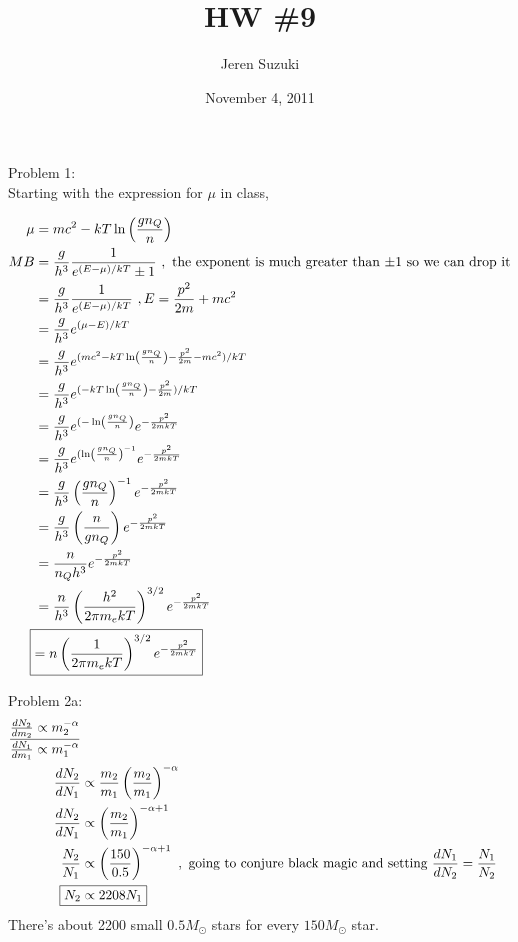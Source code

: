 \documentclass[10pt,letter,preprint]{aastex}
\newcommand{\pt}{\propto}
\newcommand{\rp}{\right)}
\newcommand{\lp}{\left(}
\newcommand{\ms}{M_\odot}
\begin{document}
\title{HW \#9}
\author{\begin{large}Jeren Suzuki\end{large}}
\author{November 4, 2011}

Problem 1:\\
Starting with the expression for $\mu$ in class, 

\begin{align}
\mu &= mc^2 - kT\ln \lp \frac{gn_Q}{n} \rp\\
MB &= \frac{g}{h^3}\frac{1}{e^{(E-\mu)/kT} \pm 1}~,\textrm{ the exponent is much greater than $\pm1$ so we can drop it}\\
&= \frac{g}{h^3}\frac{1}{e^{(E-\mu)/kT} }~,E = \frac{p^2}{2m} + mc^2\\
&= \frac{g}{h^3}e^{(\mu-E)/kT}\\
&= \frac{g}{h^3}e^{(mc^2 - kT\ln \lp \frac{gn_Q}{n} \rp - \frac{p^2}{2m} - mc^2)/kT}\\
&= \frac{g}{h^3}e^{( - kT\ln \lp \frac{gn_Q}{n} \rp - \frac{p^2}{2m})/kT}\\
&= \frac{g}{h^3}e^{( -\ln \lp \frac{gn_Q}{n} \rp}e^{- \frac{p^2}{2mkT}}\\
&= \frac{g}{h^3}e^{(\ln \lp \frac{gn_Q}{n} \rp^{-1}}e^{- \frac{p^2}{2mkT}}\\
&= \frac{g}{h^3}\lp \frac{gn_Q}{n} \rp^{-1}e^{- \frac{p^2}{2mkT}}\\
&= \frac{g}{h^3}\lp \frac{n}{gn_Q} \rp e^{- \frac{p^2}{2mkT}}\\
&= \frac{n}{n_Qh^3}e^{- \frac{p^2}{2mkT}}\\
&= \frac{n}{h^3} \lp \frac{h^2}{2 \pi m_e kT}\rp^{3/2}e^{- \frac{p^2}{2mkT}}\\
\Aboxed{&= n \lp \frac{1}{2 \pi m_e kT}\rp^{3/2}e^{- \frac{p^2}{2mkT}}}
\end{align}

\newpage
Problem 2a:\\
\begin{align}
\frac{\frac{dN_2}{dm_2} \pt m_2^{-\alpha}}{\frac{dN_1}{dm_1} \pt m_1^{-\alpha}}\\
\frac{dN_2}{dN_1} &\pt  \frac{m_2}{m_1} \lp \frac{m_2}{m_1} \rp^{-\alpha}\\
\frac{dN_2}{dN_1} &\pt  \lp \frac{m_2}{m_1} \rp^{-\alpha+1}\\
\frac{N_2}{N_1} &\pt \lp \frac{150}{0.5} \rp^{-\alpha+1}~,\textrm{ going to conjure black magic and setting } \frac{dN_1}{dN_2} = \frac{N_1}{N_2} \\
\Aboxed{N_2 &\pt 2208 N_1}
\end{align}
There's about 2200 small $0.5\ms$ stars for every $150\ms$ star.
\end{document}
